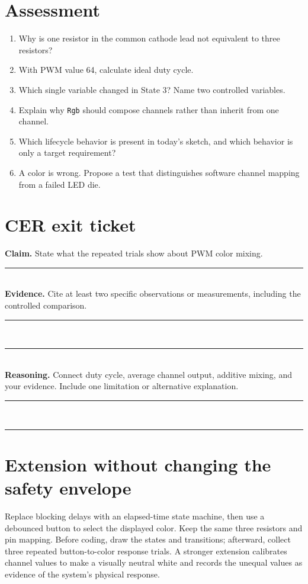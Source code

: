\documentclass[11pt]{article}
\begin{document}
\section*{Assessment}
\begin{enumerate}
  \item Why is one resistor in the common cathode lead not equivalent to three
        resistors? \vspace{1.0cm}
  \item With PWM value 64, calculate ideal duty cycle. \vspace{0.8cm}
  \item Which single variable changed in State 3? Name two controlled variables.
        \vspace{0.8cm}
  \item Explain why \texttt{Rgb} should compose channels rather than inherit from
        one channel. \vspace{0.9cm}
  \item Which lifecycle behavior is present in today's sketch, and which behavior is
        only a target requirement?
        \vspace{0.8cm}
  \item A color is wrong. Propose a test that distinguishes software channel mapping
        from a failed LED die. \vspace{1.0cm}
\end{enumerate}

\section*{CER exit ticket}
\textbf{Claim.} State what the repeated trials show about PWM color mixing.\\
\rule{\linewidth}{.2pt}\\[7mm]
\textbf{Evidence.} Cite at least two specific observations or measurements, including
the controlled comparison.\\
\rule{\linewidth}{.2pt}\\[7mm]
\rule{\linewidth}{.2pt}\\[7mm]
\textbf{Reasoning.} Connect duty cycle, average channel output, additive mixing, and
your evidence. Include one limitation or alternative explanation.\\
\rule{\linewidth}{.2pt}\\[7mm]
\rule{\linewidth}{.2pt}

\section*{Extension without changing the safety envelope}
Replace blocking delays with an elapsed-time state machine, then use a debounced
button to select the displayed color. Keep the same three resistors and pin mapping.
Before coding, draw the states and transitions; afterward, collect three repeated
button-to-color response trials. A stronger extension calibrates channel values to
make a visually neutral white and records the unequal values as evidence of the
system's physical response.
\end{document}
